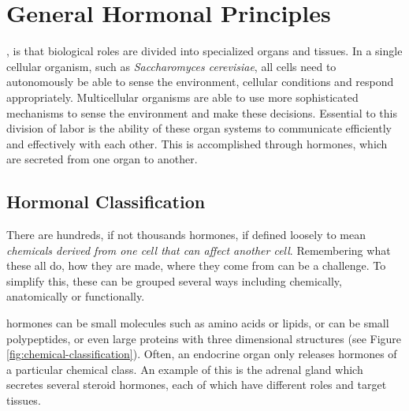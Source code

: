 \documentclass{tufte-handout}
\begin{document}
\pagebreak

\section{General Hormonal Principles}
, is that biological roles are divided into specialized organs and tissues.  In a single cellular organism, such as \textit{Saccharomyces cerevisiae}, all cells need to autonomously be able to sense the environment, cellular conditions and respond appropriately.  Multicellular organisms are able to use more sophisticated mechanisms to sense the environment and make these decisions.  Essential to this division of labor is the ability of these organ systems to communicate efficiently and effectively with each other.  This is accomplished through hormones, which are secreted from one organ to another.

\subsection{Hormonal Classification}

There are hundreds, if not thousands hormones, if defined loosely to mean \emph{chemicals derived from one cell that can affect another cell}.  Remembering what these all do, how they are made, where they come from can be a challenge.  To simplify this, these can be grouped several ways including chemically, anatomically or functionally.  

 hormones can be small molecules such as amino acids or lipids, or can be small polypeptides, or even large proteins with three dimensional structures (see Figure \ref{fig:chemical-classification}).  Often, an endocrine organ only releases hormones of a particular chemical class.  An example of this is the adrenal gland which secretes several steroid hormones, each of which have different roles and target tissues.
\end{document}
